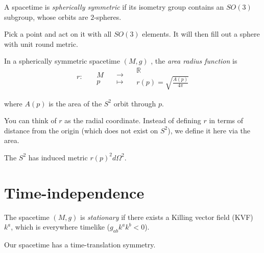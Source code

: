 \begin{definition}[]
  A spacetime is \emph{spherically symmetric} if its isometry group contains an $SO(3)$ subgroup, whose orbits are $2$-spheres.
\end{definition}
\begin{leftbar}
  Pick a point and act on it with all $SO(3)$ elements. It will then fill out a sphere with unit round metric.
\end{leftbar}
\begin{definition}[]
  In a spherically symmetric spacetime $(M, g)$ , the \emph{area radius function} is 
  \begin{equation}
    \begin{gathered}
      r \colon \\
      \qquad
    \end{gathered}
    \begin{gathered}
      M \\
      p
    \end{gathered}
    \quad
    \begin{gathered}
      \to \\
      \mapsto
    \end{gathered}
    \quad
    \begin{gathered}
      \mathbb{R} \\
      r(p) = \sqrt{\frac{A(p)}{4 \pi}}
    \end{gathered}
  \end{equation}
\end{definition}
where $A(p)$  is the area of the $S^2$  orbit through $p$. 
\begin{leftbar}
  You can think of $r$ as the radial coordinate. Instead of defining $r$ in terms of distance from the origin (which does not exist on $S^2$), we define it here via the area.
\end{leftbar}
\begin{remark}
  The $S^2$ has induced metric $r(p)^2 d\Omega^2$.
\end{remark}

\section{Time-independence}%
\label{sec:time_independence}

\begin{definition}[stationary]
  The spacetime $(M, g)$ is \emph{stationary} if there exists a Killing vector field (KVF) $k^{a}$, which is everywhere timelike ($g_{ab} k^{a} k^{b} < 0$).
\end{definition}
\begin{leftbar}
  Our spacetime has a time-translation symmetry.
\end{leftbar}

